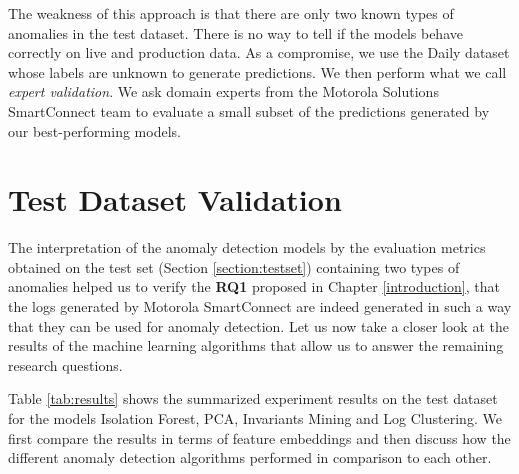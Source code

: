 The weakness of this approach is that there are only two known types of anomalies in the test dataset. There is no way to tell if the models behave correctly on live and production data. As a compromise, we use the Daily dataset whose labels are unknown to generate predictions. We then perform what we call \textit{expert validation}. We ask domain experts from the Motorola Solutions SmartConnect team to evaluate a small subset of the predictions generated by our best-performing models. 


\section{Test Dataset Validation}

The interpretation of the anomaly detection models by the evaluation metrics obtained on the test set (Section \ref{section:testset}) containing two types of anomalies helped us to verify the \textbf{RQ1} proposed in Chapter \ref{introduction}, that the logs generated by Motorola SmartConnect are indeed generated in such a way that they can be used for anomaly detection. Let us now take a closer look at the results of the machine learning algorithms that allow us to answer the remaining research questions.

Table \ref{tab:results} shows the summarized experiment results on the test dataset for the models Isolation Forest, PCA, Invariants Mining and Log Clustering. We first compare the results in terms of feature embeddings and then discuss how the different anomaly detection algorithms performed in comparison to each other.  

